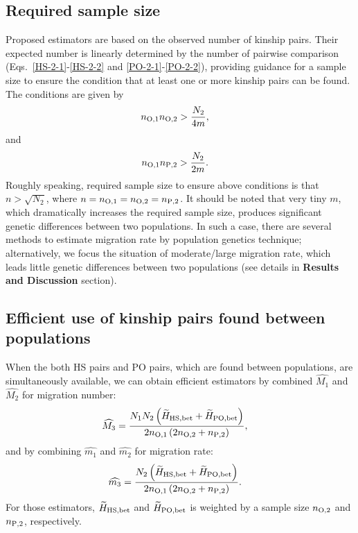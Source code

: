 \documentclass[12pt, English]{article}
\begin{document}
\begin{spacing}{1.9}
\subsection{Required sample size}

Proposed estimators are based on the observed number of kinship pairs. Their expected number is linearly determined by the number of pairwise comparison (Eqs.~\ref{HS-2-1}-\ref{HS-2-2} and \ref{PO-2-1}-\ref{PO-2-2}), providing guidance for a sample size to ensure the condition that at least one or more kinship pairs can be found. The conditions are given by
\begin{align}
n_{\rm O, 1} n_{\rm O, 2} &> \frac{ N_{2} } { 4m },
\label{RS-1}
\end{align}
and
\begin{align}
n_{\rm O, 1} n_{\rm P, 2} &> \frac{ N_{2} } { 2m }.
\label{RS-2}
\end{align}
Roughly speaking, required sample size to ensure above conditions is that $n>\sqrt{N_2}$, where $n = n_{\rm O, 1}=n_{\rm O, 2}=n_{\rm P, 2}$. It should be noted that very tiny $m$, which dramatically increases the required sample size, produces significant genetic differences between two populations. In such a case, there are several methods to estimate migration rate by population genetics technique; alternatively, we focus the situation of moderate/large migration rate, which leads little genetic differences between two populations (see details in {\bf Results and Discussion} section). 

\subsection{Efficient use of kinship pairs found between populations}

When the both HS pairs and PO pairs, which are found between populations, are simultaneously available, we can obtain efficient estimators by combined $\widehat{M_1}$ and $\widehat{M_2}$ for migration number: 
\begin{align}
\widehat{M_3} &= \frac{ N_{1} N_{2} \left(\widetilde{H}_{\rm HS,bet} + \widetilde{H}_{\rm PO,bet}\right) } {2n_{\rm O, 1} \left(2 n_{\rm O, 2} + n_{\rm P, 2}\right) },
\label{AP-1}
\end{align}
and by combining $\widehat{m_1}$ and $\widehat{m_2}$ for migration rate: 
\begin{align}
\widehat{m_3} &= \frac{ N_{2} \left(\widetilde{H}_{\rm HS,bet} + \widetilde{H}_{\rm PO,bet}\right) } {2n_{\rm O, 1} \left(2 n_{\rm O, 2} + n_{\rm P, 2}\right)}.
\label{AP-2}
\end{align}
For those estimators, $\widetilde{H}_{\rm HS,bet}$ and $\widetilde{H}_{\rm PO,bet}$ is weighted by a sample size $n_{\rm O, 2}$ and $n_{\rm P, 2}$, respectively. 


\end{spacing}
\end{document}
